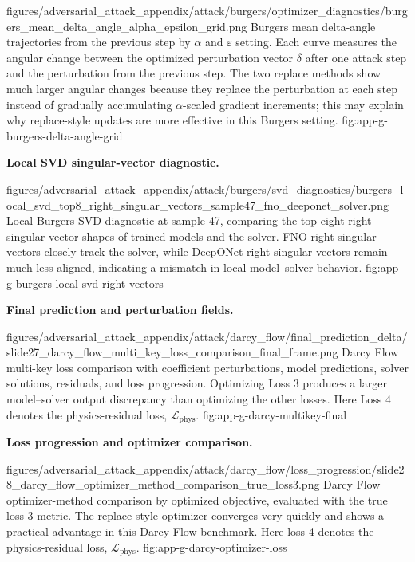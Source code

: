 ﻿\documentclass[letterpaper]{article} %
\newcounter{appendixsection}
\newcounter{appendixsubsection}[appendixsection]
\newcounter{appendixdomain}[appendixsubsection]
\begin{document}
\appendixattackfig
  {figures/adversarial_attack_appendix/attack/burgers/optimizer_diagnostics/burgers_mean_delta_angle_alpha_epsilon_grid.png}
  {Burgers mean delta-angle trajectories from the previous step by $\alpha$ and
  $\varepsilon$ setting. Each curve measures the angular change between the
  optimized perturbation vector $\delta$ after one attack step and the
  perturbation from the previous step. The two replace methods show much larger
  angular changes because they replace the perturbation at each step instead of
  gradually accumulating $\alpha$-scaled gradient increments; this may explain
  why replace-style updates are more effective in this Burgers setting.}
  {fig:app-g-burgers-delta-angle-grid}

\noindent\textbf{Local SVD singular-vector diagnostic.}

\appendixattackfig
  {figures/adversarial_attack_appendix/attack/burgers/svd_diagnostics/burgers_local_svd_top8_right_singular_vectors_sample47_fno_deeponet_solver.png}
  {Local Burgers SVD diagnostic at sample 47, comparing the top eight right
  singular-vector shapes of trained models and the solver. FNO right singular
  vectors closely track the solver, while DeepONet right singular vectors remain
  much less aligned, indicating a mismatch in local model--solver behavior.}
  {fig:app-g-burgers-local-svd-right-vectors}

\FloatBarrier
{}

\noindent\textbf{Final prediction and perturbation fields.}

\appendixattackfig
  {figures/adversarial_attack_appendix/attack/darcy_flow/final_prediction_delta/slide27_darcy_flow_multi_key_loss_comparison_final_frame.png}
  {Darcy Flow multi-key loss comparison with coefficient perturbations, model
  predictions, solver solutions, residuals, and loss progression. Optimizing
  Loss 3 produces a larger model--solver output discrepancy than optimizing the
  other losses. Here Loss 4 denotes the physics-residual loss,
  $\mathcal{L}_{\mathrm{phys}}$.}
  {fig:app-g-darcy-multikey-final}

\clearpage
\noindent\textbf{Loss progression and optimizer comparison.}

\appendixattackfigstacked
  {figures/adversarial_attack_appendix/attack/darcy_flow/loss_progression/slide28_darcy_flow_optimizer_method_comparison_true_loss3.png}
  {Darcy Flow optimizer-method comparison by optimized objective, evaluated
  with the true loss-3 metric. The replace-style optimizer converges very
  quickly and shows a practical advantage in this Darcy Flow benchmark. Here
  loss 4 denotes the physics-residual loss, $\mathcal{L}_{\mathrm{phys}}$.}
  {fig:app-g-darcy-optimizer-loss}
\end{document}
